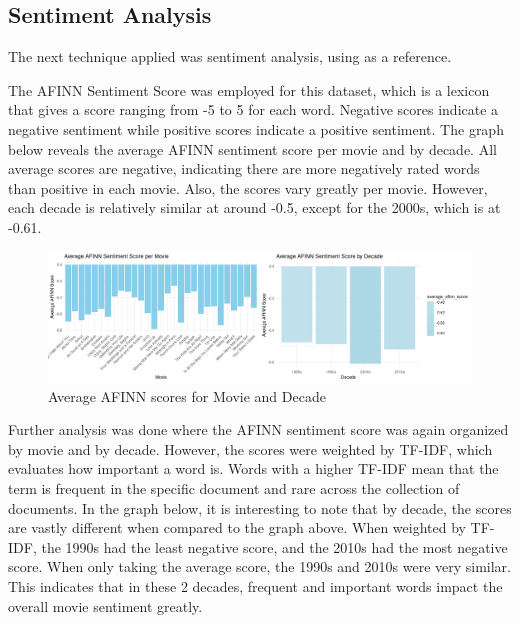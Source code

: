 \documentclass[
  authoryear,
  preprint]{elsarticle}
\begin{document}
\subsection{Sentiment Analysis}\label{sentiment-analysis}

The next technique applied was sentiment analysis, using
\citet{pang2008opinion} as a reference.

The AFINN Sentiment Score was employed for this dataset, which is a
lexicon that gives a score ranging from -5 to 5 for each word. Negative
scores indicate a negative sentiment while positive scores indicate a
positive sentiment. The graph below reveals the average AFINN sentiment
score per movie and by decade. All average scores are negative,
indicating there are more negatively rated words than positive in each
movie. Also, the scores vary greatly per movie. However, each decade is
relatively similar at around -0.5, except for the 2000s, which is at
-0.61.~

\begin{figure}[H]

{\centering \includegraphics{images/avg_afinn-imageonline.co-merged.png}

}

\caption{Average AFINN scores for Movie and Decade}

\end{figure}%

Further analysis was done where the AFINN sentiment score was again
organized by movie and by decade. However, the scores were weighted by
TF-IDF, which evaluates how important a word is. Words with a higher
TF-IDF mean that the term is frequent in the specific document and rare
across the collection of documents. In the graph below, it is
interesting to note that by decade, the scores are vastly different when
compared to the graph above. When weighted by TF-IDF, the 1990s had the
least negative score, and the 2010s had the most negative score. When
only taking the average score, the 1990s and 2010s were very similar.
This indicates that in these 2 decades, frequent and important words
impact the overall movie sentiment greatly.
\end{document}
